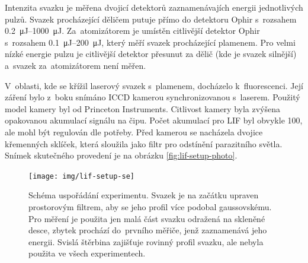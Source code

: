 Intenzita svazku je měřena dvojicí detektorů
zaznamenávajích energii jednotlivých pulzů.
Svazek procházející děličem putuje přímo do detektoru
Ophir 
s~rozsahem \SIrange{0.2}{1000}{\micro\joule}.
Za~atomizátorem je umístěn citlivější detektor
Ophir 
s~rozsahem \SIrange{0.1}{200}{\micro\joule},
který měří svazek procházející plamenem.
Pro velmi nízké energie pulzu je citlivější detektor přesunut
za dělič (kde je svazek silnější) a~svazek za~atomizátorem není měřen.

V~oblasti, kde se křížil laserový svazek s~plamenem, docházelo k~fluorescenci.
Její záření bylo z~boku snímáno ICCD kamerou synchronizovanou s~laserem.
Použitý model kamery byl  od Princeton Instruments.
Citlivost kamery byla zvýšena opakovanou akumulací signálu na čipu.
Počet akumulací pro LIF byl obvykle 100, ale mohl být regulován dle potřeby.
Před kamerou se nacházela dvojice křemenných sklíček,
která sloužila jako filtr pro odstínění parazitního světla.
Snímek skutečného provedení je na obrázku \ref{fig:lif-setup-photo}.

\begin{figure}[htb]
	\centering
	\texttt{[image: img/lif-setup-se]}
	\caption{Schéma uspořádání experimentu.
		Svazek je na začátku upraven prostorovým filtrem,
		aby se jeho profil více podobal gaussovskému.
		Pro měření je použita jen malá část svazku odražená na skleněné desce,
		zbytek prochází do~prvního měřiče, jenž zaznamenává jeho energii.
		Svislá štěrbina zajišťuje rovinný profil svazku,
		ale nebyla použita ve všech experimentech.}
	\label{fig:lif-setup}
\end{figure}

